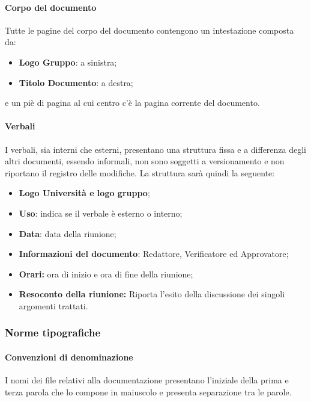 		\paragraph*{Corpo del documento}      
		\aCapo{}   
			Tutte le pagine del corpo del documento contengono un intestazione composta da:
				\begin{itemize}
					\item \textbf{Logo Gruppo}: a sinistra;
					\item \textbf{Titolo Documento}: a destra;
				\end{itemize}
			e un piè di pagina al cui centro c'è la pagina corrente del documento.
			
		\paragraph*{Verbali} %
		\aCapo{}  
			I verbali, sia interni che esterni, presentano una struttura fissa e a differenza degli altri documenti, essendo informali, non sono soggetti a versionamento e non riportano il registro delle modifiche.
			La struttura sarà quindi la seguente:
				\begin{itemize}
					\item \textbf{Logo Università e logo gruppo};
					\item \textbf{Uso}: indica se il verbale è esterno o interno;
					\item \textbf{Data}: data della riunione;
					\item \textbf{Informazioni del documento}: Redattore, Verificatore ed Approvatore;
					\item \textbf{Orari:} ora di inizio e ora di fine della riunione;
					\item \textbf{Resoconto della riunione:} Riporta l'esito della discussione dei singoli argomenti trattati.								
				\end{itemize}
	
	\subsubsection{Norme tipografiche}
		\paragraph*{Convenzioni di denominazione}   %
		\aCapo{}  
			I nomi dei file relativi alla documentazione presentano l'iniziale della prima e terza parola che lo compone in maiuscolo e presenta separazione tra le parole. 

